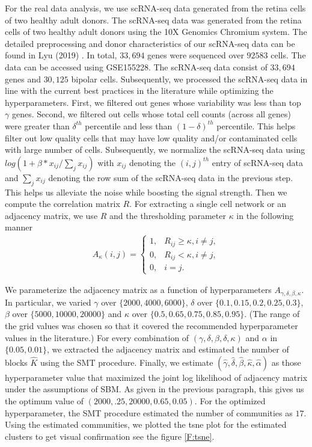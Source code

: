 \documentclass[11pt]{article}
\newcommand{\ba}{\begin{eqnarray*}}
\newcommand{\ea}{\end{eqnarray*}}
\begin{document}
For the real data analysis, we use scRNA-seq data generated from the retina cells of two healthy adult donors. The scRNA-seq data was generated from the retina cells of two healthy adult donors using the 10X Genomics Chromium system. The detailed preprocessing and donor characteristics of our scRNA-seq data can be found in Lyu (2019) \cite{lyu2019}. In total, $33,694$ genes were sequenced over $92583$ cells. The data can be accessed using GSE155228. The scRNA-seq data consist of $33,694$ genes and $30,125$ bipolar cells. Subsequently, we processed the scRNA-seq data in line with the current best practices in the literature while optimizing the hyperparameters. First, we filtered out genes whose variability was less than top $\gamma$ genes. Second, we filtered out cells whose total cell counts (across all genes) were greater than $\delta^{th}$ percentile and less than $(1-  \delta)^{th}$ percentile. This helps filter out low quality cells that may have low quality and/or contaminated cells with large number of cells. Subsequently, we normalize the scRNA-seq data using $log(1 + \beta* x_{ij}/\sum_{j} x_{ij})$ with $x_{ij}$ denoting the $(i,j)^{th}$ entry of scRNA-seq data and $\sum_{j} x_{ij}$ denoting the row sum of the scRNA-seq data in the previous step. This helps us alleviate the noise while boosting the signal strength. Then we compute the correlation matrix $R$. For extracting a single cell network or an adjacency matrix, we use $R$ and the thresholding parameter $\kappa$ in the following manner
\ba
A_{\kappa}(i,j) = \begin{cases}
1, & R_{ij} \ge \kappa, i \neq j , \\
0, & R_{ij} < \kappa, i \neq j ,\\
0, & i =j.
\end{cases}
\ea

We parameterize the adjacency matrix as a function of hyperparameters $A_{\gamma, \delta, \beta, \kappa}$. In particular, we varied $\gamma$ over $\{2000, 4000, 6000\}$, $\delta$ over $\{0.1, 0.15, 0.2, 0.25, 0.3\}$, $\beta$ over $\{5000, 10000, 20000 \}$ and $\kappa$ over $\{0.5, 0.65, 0.75, 0.85, 0.95 \}$. (The range of the grid values was chosen so that it covered the recommended hyperparameter values in the literature.) For every combination of $(\gamma, \delta, \beta, \delta, \kappa)$ and $\alpha$ in $\{0.05, 0.01\}$, we extracted the adjacency matrix and estimated the number of blocks $\hat{K}$ using the SMT procedure. Finally, we estimate $(\hat{\gamma}, \hat{\delta}, \hat{\beta},\hat{\kappa}, \hat{\alpha})$ as those hyperparameter value that maximized the joint log likelihood of adjacency matrix under the assumptions of SBM. As given in the previous paragraph, this gives us the optimum value of $(2000, .25, 20000, 0.65, 0.05)$. For the optimized hyperparameter, the SMT procedure estimated the number of communities as $17$. Using the estimated communities, we plotted the tsne plot for the estimated clusters to get visual confirmation see the figure \ref{F:tsne}.
\end{document}
